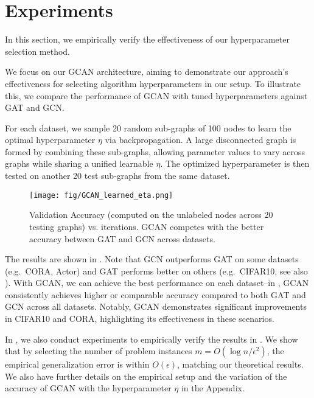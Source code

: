 \section{Experiments}
In this section, we empirically verify the effectiveness of our hyperparameter selection method.

We focus on our GCAN architecture, aiming to demonstrate our approach's effectiveness for selecting algorithm hyperparameters in our setup. To illustrate this, we compare the performance of GCAN with tuned hyperparameters against GAT and GCN.

For each dataset, we sample 20 random sub-graphs of 100 nodes to learn the optimal hyperparameter $\eta$ via backpropagation. A large disconnected graph is formed by combining these sub-graphs, allowing parameter values to vary across graphs while sharing a unified learnable $\eta$. The optimized hyperparameter is then tested on another 20 test sub-graphs from the same dataset.

\begin{figure*}[ht]
    \centering
    \texttt{[image: fig/GCAN\_learned\_eta.png]}
    \caption{Validation Accuracy (computed on the unlabeled nodes across 20 testing graphs) vs. iterations. GCAN competes with the better accuracy between GAT and GCN across datasets. }
    \label{fig:gcan_multi}
\end{figure*}

The results are shown in . Note that GCN outperforms GAT on some datasets (e.g.\ CORA, Actor) and GAT performs better on others (e.g.\ CIFAR10, see also \cite{dwivedi2023benchmarking}). With GCAN, we can achieve the best performance on each dataset--in , GCAN consistently achieves higher or comparable accuracy compared to both GAT and GCN across all datasets. Notably, GCAN demonstrates significant improvements in CIFAR10 and CORA, highlighting its effectiveness in these scenarios. 

In , we also conduct experiments to empirically verify the results in . We show that by selecting the number of problem instances $m = O(\log n / \epsilon^2)$, the empirical generalization error is within $O(\epsilon)$, matching our theoretical results. We also have further details on the empirical setup and the variation of the accuracy of GCAN with the hyperparameter $\eta$ in the Appendix. 